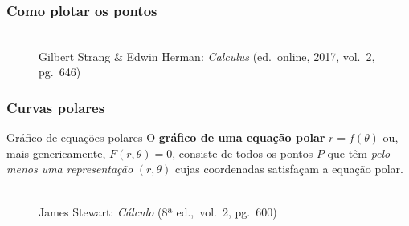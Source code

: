 \documentclass[pdftex, brazil, aspectratio=169]{beamer}
\begin{document}
\begin{frame}[t]
  \frametitle{Como plotar os pontos}
    \begin{figure}[H]
      \begin{center}
        \label{fig:int2-17}
        \\
        \footnotesize{Gilbert Strang \& Edwin Herman: \emph{Calculus}
          (ed.\ online, 2017, vol.\ 2, pg.\ 646)}
      \end{center}
    \end{figure}
\end{frame}

\begin{frame}[t]
  \frametitle{Curvas polares}
  \begin{block}{Gráfico de equações polares}
    O \textbf{gráfico de uma equação polar} $r = f(\theta)$ ou, mais
    genericamente, $F(r,\theta)=0$, consiste de todos os pontos $P$
    que têm \emph{pelo menos uma representação} $(r, \theta)$ cujas
    coordenadas satisfaçam a equação polar.
  \end{block}
  \begin{figure}[H]
      \begin{center}
        \label{fig:int2-11}
        \\
        \footnotesize{James Stewart: \emph{Cálculo} (8ª ed.,\ vol.\ 2, pg.\ 600)}
      \end{center}
    \end{figure}
\end{frame}
\end{document}
